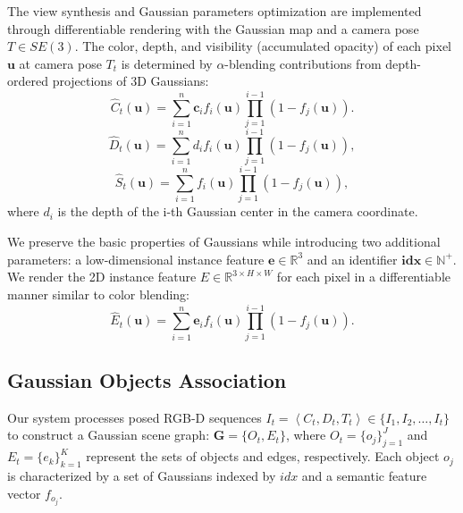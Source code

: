 The view synthesis and Gaussian parameters optimization are implemented through differentiable rendering with the Gaussian map and a camera pose $T \in SE(3)$. The color, depth, and visibility (accumulated opacity) of each pixel $\mathbf{u}$ at camera pose $T_t$ is determined by $\alpha$-blending contributions from depth-ordered projections of 3D Gaussians:
\begin{equation}
\label{eq:render_rgb}
\hat{C}_t(\mathbf{u})=\sum_{i=1}^n\mathbf{c}_if_i(\mathbf{u})\prod_{j=1}^{i-1}\left(1-f_j(\mathbf{u})\right).
\end{equation}
\begin{equation}
\label{eq:render_depth}
    \hat{D}_t(\mathbf{u}) =\sum_{i=1}^n d_if_i(\mathbf{u})\prod_{j=1}^{i-1}\left(1-f_j(\mathbf{u})\right),
\end{equation}
\begin{equation}
\label{eq:render_opacity}
\hat{S}_t(\mathbf{u}) =\sum_{i=1}^nf_i(\mathbf{u})\prod_{j=1}^{i-1}\left(1-f_j(\mathbf{u})\right),
\end{equation}
where $d_i$ is the depth of the i-th Gaussian center in the camera coordinate.

We preserve the basic properties of Gaussians while introducing two additional parameters: a low-dimensional instance feature $\mathbf{e} \in \mathbb{R}^3$ and an identifier $\mathbf{idx} \in \mathbb{N}^+$. We render the 2D instance feature $\hat{E} \in \mathbb{R}^{3\times H\times W}$ for each pixel in a differentiable manner similar to color blending:
\begin{equation}
\label{eq:render_feature}
\hat{E}_t(\mathbf{u})=\sum_{i=1}^n\mathbf{e}_if_i(\mathbf{u})\prod_{j=1}^{i-1}\left(1-f_j(\mathbf{u})\right).
\end{equation}


\subsection{Gaussian Objects Association}
\label{subsec:obj_association}
Our system processes posed RGB-D sequences $ I_t= \left \langle C_t, D_t, T_t \right \rangle  \in \{ I_1, I_2, \dots, I_t \} $ to construct a Gaussian scene graph: $\textbf{G}=\{O_{t}, E_t\}$, where $ O_t=\{ o_j \}_{j=1}^{J} $ and $ E_t=\{ e_k \}_{k=1}^{K} $ represent the sets of objects and edges, respectively. Each object $o_j$ is characterized by a set of Gaussians indexed by $ idx $ and a semantic feature vector $ f_{o_j} $.

